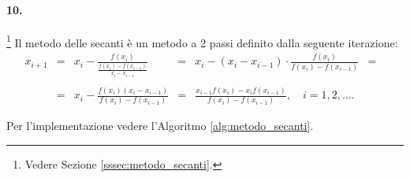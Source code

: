 \paragraph{10.}\footnote{Vedere Sezione \ref{sssec:metodo_secanti}.} Il metodo delle secanti è un metodo a 2 passi definito dalla seguente iterazione:
\begin{equation*}
	\begin{matrix}
		x_{i+1} &=& x_i-\frac{f(x_i)}{\frac{f(x_i)-f(x_{i-1})}{x_i-x_{i-1}}} &=& x_i-(x_i-x_{i-1})\cdot\frac{f(x_i)}{f(x_i)-f(x_{i-1})}&=&\\\\
		&=& x_i-\frac{f(x_i)(x_i-x_{i-1})}{f(x_i)-f(x_{i-1})} &=& \frac{x_{i-1}f(x_i)-x_i f(x_{i-1})}{f(x_i)-f(x_{i-1})},\quad i=1,2,\hdots.
	\end{matrix}
\end{equation*}

Per l'implementazione vedere l'Algoritmo \ref{alg:metodo_secanti}.